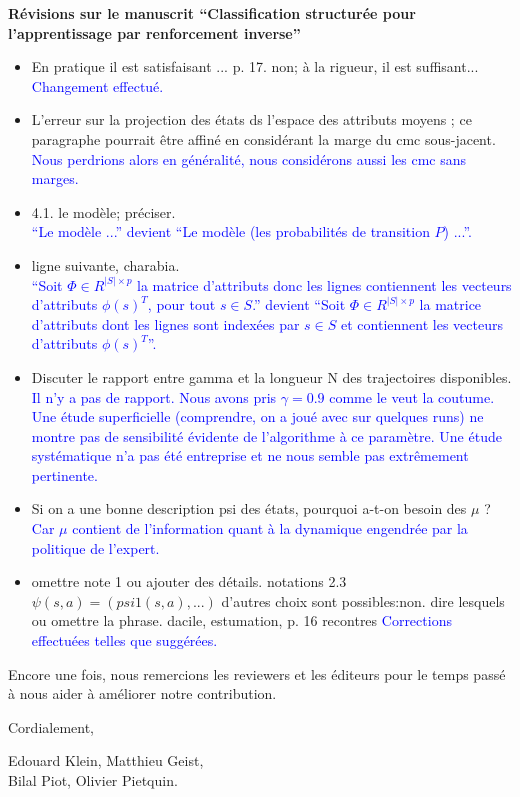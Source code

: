 \documentclass[11pt, a4paper]{letter}
\begin{document}
\begin{letter}{\large \textbf{Révisions sur le manuscrit ``Classification structurée pour l'apprentissage par renforcement inverse''}}
\begin{itemize}
{}
\item En pratique il est satisfaisant ... p. 17. non; à la rigueur, il est suffisant...\\
  \textcolor{blue}{Changement effectué.}
\item L'erreur sur la projection des états ds l'espace des attributs moyens ; ce paragraphe pourrait être affiné en considérant la marge du cmc sous-jacent.\\
  \textcolor{blue}{Nous perdrions alors en généralité, nous considérons aussi les cmc sans marges.}
\item 4.1.
le modèle; préciser.\\
 \textcolor{blue}{ ``Le modèle ...'' devient ``Le modèle (les probabilités de transition $P$) ...''.}
 \item ligne suivante, charabia.\\
 \textcolor{blue}{ ``Soit $\Phi\in R^{|S|\times p}$ la matrice d'attributs donc les lignes contiennent les vecteurs d'attributs $\phi(s)^T$, pour tout $s\in S$.'' devient ``Soit $\Phi\in R^{|S|\times p}$ la matrice d'attributs dont les lignes sont indexées par $s\in S$ et contiennent les vecteurs d'attributs $\phi(s)^T$''.}
 \item Discuter le rapport entre gamma et la longueur N des trajectoires disponibles.\\
 \textcolor{blue}{Il n'y a pas de rapport. Nous avons pris $\gamma = 0.9$ comme le veut la coutume. Une étude superficielle (comprendre, on a joué avec sur quelques runs) ne montre pas de sensibilité évidente de l'algorithme à ce paramètre. Une étude systématique n'a pas été entreprise et ne nous semble pas extrêmement pertinente.}
\item Si on a une bonne description psi des états, pourquoi a-t-on besoin des $\mu$ ?
\textcolor{blue}{Car $\mu$ contient de l'information quant à la dynamique engendrée par la politique de l'expert.}
\item
  omettre note 1 ou ajouter des détails.
notations 2.3 $\psi(s,a)= (psi1(s,a),...)$
d'autres choix sont possibles:non. dire lesquels ou omettre la phrase.
dacile, estumation, p. 16
recontres
\textcolor{blue}{Corrections effectuées telles que suggérées.
}
\end{itemize}

\newpage

\color{blue} Encore une fois, nous remercions les reviewers et les éditeurs pour le temps passé à nous aider à améliorer notre contribution.

Cordialement,

\begin{flushright}
Edouard Klein, Matthieu Geist, \\ Bilal Piot, Olivier Pietquin.
\end{flushright}


\end{letter}
\end{document}
